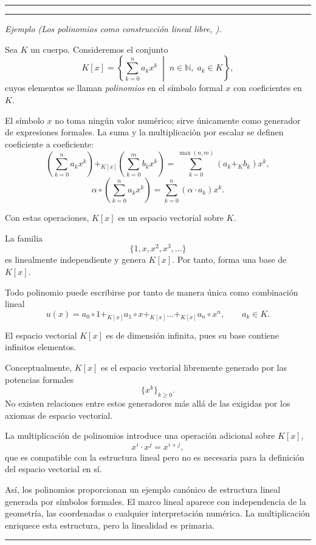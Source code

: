 \medskip
\hrule
\bigskip

\bigskip
\hrule
\medskip

\textit{Ejemplo (Los polinomios como construcción lineal libre, \cite{knuth2}).}

Sea $K$ un cuerpo. Consideremos el conjunto
\[
K[x] = \left\{
\sum_{k=0}^{n} a_k x^k
\;\middle|\;
n \in \mathbb{N},\; a_k \in K
\right\},
\]
cuyos elementos se llaman \emph{polinomios} en el símbolo formal $x$ con coeficientes en $K$.

\medskip

El símbolo $x$ no toma ningún valor numérico; sirve únicamente como generador de expresiones formales.
La suma y la multiplicación por escalar se definen coeficiente a coeficiente:
\[
\left( \sum_{k=0}^{n} a_k x^k \right)
+_{K[x]}
\left( \sum_{k=0}^{m} b_k x^k \right)
=
\sum_{k=0}^{\max(n,m)} (a_k +_K b_k) x^k,
\]
\[
\alpha \circ
\left( \sum_{k=0}^{n} a_k x^k \right)
=
\sum_{k=0}^{n} (\alpha \cdot a_k) x^k.
\]

\medskip

Con estas operaciones, $K[x]$ es un espacio vectorial sobre $K$.

\medskip

La familia
\[
\{ 1, x, x^2, x^3, \dots \}
\]
es linealmente independiente y genera $K[x]$. Por tanto, forma una base de $K[x]$.

\medskip

Todo polinomio puede escribirse por tanto de manera única como combinación lineal
\[
u(x)
=
a_0 \circ 1
+_{K[x]}
a_1 \circ x
+_{K[x]}
\dots
+_{K[x]}
a_n \circ x^n,
\qquad a_k \in K.
\]

\medskip

El espacio vectorial $K[x]$ es de dimensión infinita, pues su base contiene infinitos elementos.

\medskip

Conceptualmente, $K[x]$ es el espacio vectorial libremente generado por las potencias formales
\[
\{ x^k \}_{k \ge 0}.
\]
No existen relaciones entre estos generadores más allá de las exigidas por los axiomas de espacio vectorial.

\medskip

La multiplicación de polinomios introduce una operación adicional sobre $K[x]$,
\[
x^i \cdot x^j = x^{i+j},
\]
que es compatible con la estructura lineal pero no es necesaria para la definición del espacio vectorial en sí.

\medskip

Así, los polinomios proporcionan un ejemplo canónico de estructura lineal generada por símbolos formales. El marco lineal aparece con independencia de la geometría, las coordenadas o cualquier interpretación numérica.
La multiplicación enriquece esta estructura, pero la linealidad es primaria.

\medskip
\hrule
\bigskip